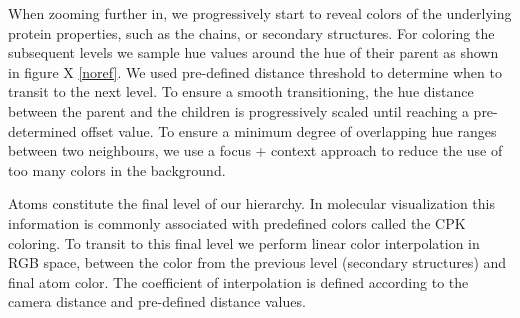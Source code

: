 \documentclass[review,journal]{vgtc}         %
\begin{document}
When zooming further in, we progressively start to reveal colors of the underlying protein properties, such as the chains, or secondary structures.
For coloring the subsequent levels we sample hue values around the hue of their parent as shown in figure X \ref{noref}.
We used pre-defined distance threshold to determine when to transit to the next level.
To ensure a smooth transitioning, the hue distance between the parent and the children is progressively scaled until reaching a pre-determined offset value.
To ensure a minimum degree of overlapping hue ranges between two neighbours, we use a focus + context approach to reduce the use of too many colors in the background.

Atoms constitute the final level of our hierarchy.
In molecular visualization this information is commonly associated with predefined colors called the CPK coloring.
To transit to this final level we perform linear color interpolation in RGB space, between the color from the previous level (secondary structures) and final atom color.
The coefficient of interpolation is defined according to the camera distance and pre-defined distance values.

%
%
%
%
%
\end{document}
